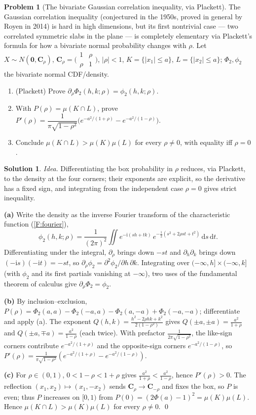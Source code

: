 \documentclass[14pt]{extarticle}
\theoremstyle{definition}
\newtheorem{exercise}{Problem}
\newtheorem*{solution}{Solution}
\theoremstyle{remark}
\newcommand{\dd}{\mathrm{d}}
\newcommand{\bC}{\mathbf{C}}
\newcommand{\bzero}{\mathbf{0}}
\begin{document}
\begin{exercise}[The bivariate Gaussian correlation inequality, via Plackett]\label{prob:box}
The Gaussian correlation inequality (conjectured in the 1950s, proved in general by Royen in 2014) is hard in high dimensions, but its first nontrivial case --- two correlated symmetric slabs in the plane --- is completely elementary via Plackett's formula for how a bivariate normal probability changes with $\rho$. Let $X\sim N(\bzero,\bC_\rho)$, $\bC_\rho=\bigl(\begin{smallmatrix}1&\rho\\\rho&1\end{smallmatrix}\bigr)$, $|\rho|<1$, $K=\{|x_1|\le a\}$, $L=\{|x_2|\le a\}$; $\Phi_2,\phi_2$ the bivariate normal CDF/density.
\begin{enumerate}[label=(\alph*)]
\item (Plackett) Prove $\partial_\rho\Phi_2(h,k;\rho)=\phi_2(h,k;\rho)$.
\item With $P(\rho)=\mu(K\cap L)$, prove $P'(\rho)=\dfrac1{\pi\sqrt{1-\rho^2}}\bigl(e^{-a^2/(1+\rho)}-e^{-a^2/(1-\rho)}\bigr)$.
\item Conclude $\mu(K\cap L)>\mu(K)\mu(L)$ for every $\rho\neq0$, with equality iff $\rho=0$.
\end{enumerate}
\end{exercise}
\begin{solution}
\emph{Idea.} Differentiating the box probability in $\rho$ reduces, via Plackett, to the density at the four corners; their exponents are explicit, so the derivative has a fixed sign, and integrating from the independent case $\rho=0$ gives strict inequality.

\textbf{(a)} Write the density as the inverse Fourier transform of the characteristic function (\ref{F:fourier}),
\[
\phi_2(h,k;\rho)=\frac1{(2\pi)^2}\iint e^{-\mathrm i(sh+tk)}\,e^{-\frac12(s^2+2\rho st+t^2)}\,\dd s\,\dd t.
\]
Differentiating under the integral, $\partial_\rho$ brings down $-st$ and $\partial_h\partial_k$ brings down $(-\mathrm is)(-\mathrm it)=-st$, so $\partial_\rho\phi_2=\partial^2\phi_2/\partial h\,\partial k$. Integrating over $(-\infty,h]\times(-\infty,k]$ (with $\phi_2$ and its first partials vanishing at $-\infty$), two uses of the fundamental theorem of calculus give $\partial_\rho\Phi_2=\phi_2$.

\textbf{(b)} By inclusion--exclusion, $P(\rho)=\Phi_2(a,a)-\Phi_2(-a,a)-\Phi_2(a,-a)+\Phi_2(-a,-a)$; differentiate and apply (a). The exponent $Q(h,k)=\tfrac{h^2-2\rho hk+k^2}{2(1-\rho^2)}$ gives $Q(\pm a,\pm a)=\tfrac{a^2}{1+\rho}$ and $Q(\pm a,\mp a)=\tfrac{a^2}{1-\rho}$ (each twice). With prefactor $\tfrac1{2\pi\sqrt{1-\rho^2}}$, the like-sign corners contribute $e^{-a^2/(1+\rho)}$ and the opposite-sign corners $e^{-a^2/(1-\rho)}$, so $P'(\rho)=\tfrac1{\pi\sqrt{1-\rho^2}}(e^{-a^2/(1+\rho)}-e^{-a^2/(1-\rho)})$.

\textbf{(c)} For $\rho\in(0,1)$, $0<1-\rho<1+\rho$ gives $\tfrac{a^2}{1+\rho}<\tfrac{a^2}{1-\rho}$, hence $P'(\rho)>0$. The reflection $(x_1,x_2)\mapsto(x_1,-x_2)$ sends $\bC_\rho\to\bC_{-\rho}$ and fixes the box, so $P$ is even; thus $P$ increases on $[0,1)$ from $P(0)=(2\Phi(a)-1)^2=\mu(K)\mu(L)$. Hence $\mu(K\cap L)>\mu(K)\mu(L)$ for every $\rho\neq0$. \qed
\end{solution}
\end{document}
